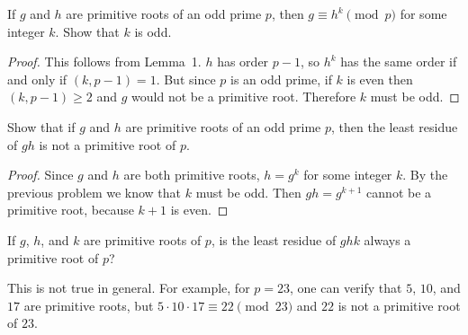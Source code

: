  If $g$ and $h$ are primitive roots of an odd prime $p$,
then $g \equiv h^k\pmod{p}$ for some integer $k$. Show that $k$ is
odd.
\begin{proof}
  This follows from Lemma~1. $h$ has order $p - 1$, so $h^k$ has the
  same order if and only if $(k,p-1) = 1$. But since $p$ is an odd
  prime, if $k$ is even then $(k,p-1)\geq2$ and $g$ would not be a
  primitive root. Therefore $k$ must be odd.
\end{proof}

 Show that if $g$ and $h$ are primitive roots of an odd
prime $p$, then the least residue of $gh$ is not a primitive root of
$p$.
\begin{proof}
  Since $g$ and $h$ are both primitive roots, $h = g^k$ for some
  integer $k$. By the previous problem we know that $k$ must be
  odd. Then $gh = g^{k+1}$ cannot be a primitive root, because $k+1$
  is even.
\end{proof}

 If $g$, $h$, and $k$ are primitive roots of $p$, is the
least residue of $ghk$ always a primitive root of $p$?
\begin{solution}
  This is not true in general. For example, for $p = 23$, one can
  verify that $5$, $10$, and $17$ are primitive roots, but
  $5\cdot10\cdot17\equiv22\pmod{23}$ and $22$ is not a primitive root
  of $23$.
\end{solution}
